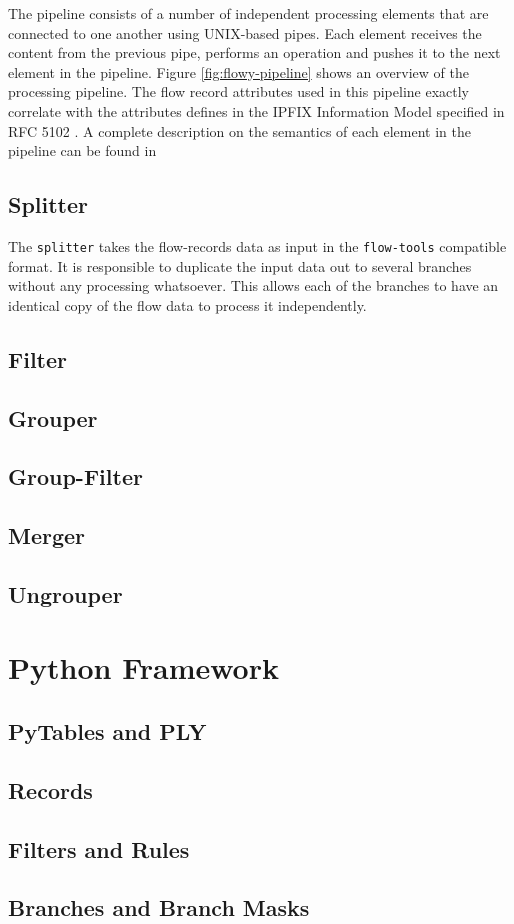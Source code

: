 The pipeline consists of a number of independent processing elements that are connected to one another using UNIX-based pipes. Each element receives the content from the previous pipe, performs an operation and pushes it to the next element in the pipeline. Figure \ref{fig:flowy-pipeline} shows an overview of the processing pipeline. The flow record attributes used in this pipeline exactly correlate with the attributes defines in the \ac{IPFIX} Information Model specified in RFC 5102 \cite{rfc5102}. A complete description on the semantics of each element in the pipeline can be found in \cite{vmarinov:thesis:2009}

\subsection{Splitter}\label{subsec:splitter}
The \texttt{splitter} takes the flow-records data as input in the \texttt{flow-tools} compatible format. It is responsible to duplicate the input data out to several branches without any processing whatsoever. This allows each of the branches to have an identical copy of the flow data to process it independently.

\subsection{Filter}\label{subsec:filter}


 \subsection{Grouper}\label{subsec:grouper}
 \subsection{Group-Filter}\label{subsec:group-filter}
 \subsection{Merger}\label{subsec:merger}
 \subsection{Ungrouper}\label{subsec:ungrouper}

\section{Python Framework}\label{sec:python-framework}
	\subsection{PyTables and PLY}\label{subsec:pytable-ply}
	\subsection{Records}\label{subsec:records}
	\subsection{Filters and Rules}\label{subsec:filters-rules}
	\subsection{Branches and Branch Masks}\label{subsec:branches-branchmasks}
